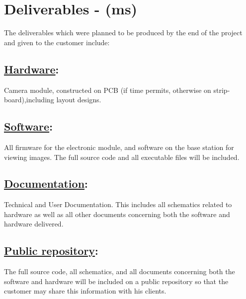 \section{Deliverables - (ms)}

The deliverables which were planned to be produced by the end of the project and given to the customer include:

	\subsection{\underline{Hardware}:} 
	\label{sec:deliv_hw} 
	Camera module, constructed on PCB (if time permits, otherwise on strip-board),including layout designs.
	\subsection{\underline{Software}:} 
	\label{sec:deliv_sw} 
	All firmware for the electronic module, and software on the base station for viewing images. The full source code and all executable files will be included.
	\subsection{\underline{Documentation}:} 
	\label{sec:deliv_doc} 
	Technical and User Documentation. This includes all schematics related to hardware as well as all other documents concerning both the software and hardware delivered.
	\subsection{\underline{Public repository}:} 
	\label{sec:deliv_git} 
	The full source code, all schematics, and all documents concerning both the software and hardware will be included on a public repository so that the customer may share this information with his clients.

